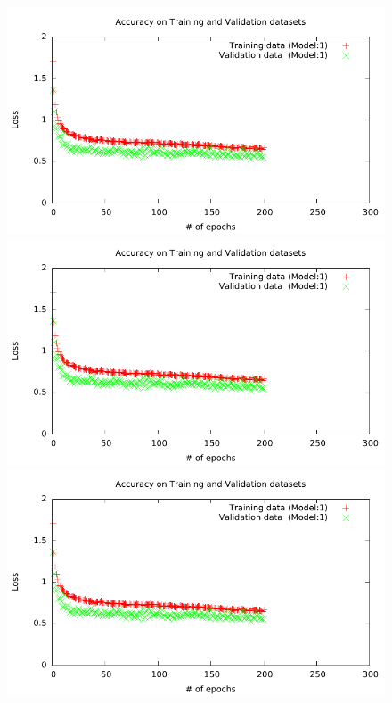 \documentclass[]{article}
\begin{document}
\begin{figure}
\centering
\begin{minipage}{0.48\textwidth}
\includegraphics[scale=0.55, page=1]{Submissionlogs/LogLoss.pdf}
\end{minipage}
\hfill
\begin{minipage}{0.48\textwidth}
\includegraphics[scale=0.55, page=2]{Submissionlogs/LogLoss.pdf}
\end{minipage}
\hfill
\begin{minipage}{0.48\textwidth}
\includegraphics[scale=0.55, page=3]{Submissionlogs/LogLoss.pdf}

\end{minipage}
\end{figure}
\end{document}

